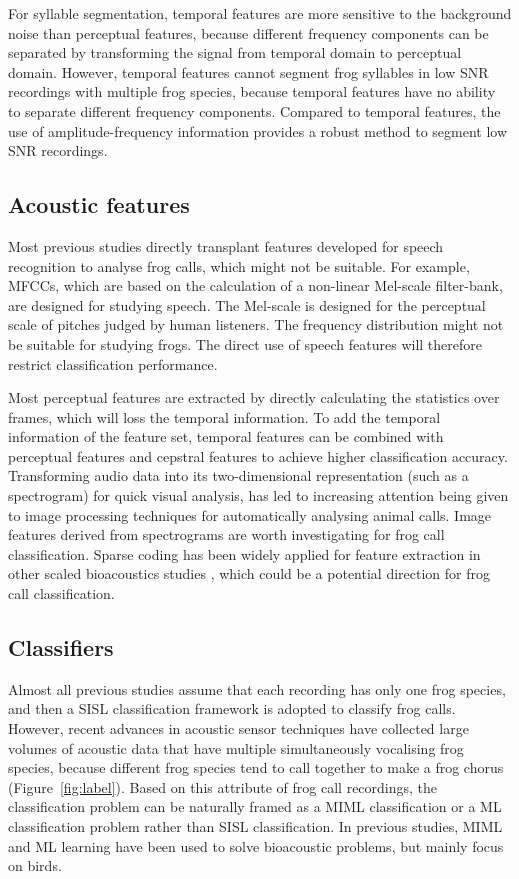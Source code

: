 For syllable segmentation, temporal features are more sensitive to  the background noise than perceptual features, because different frequency components can be separated by transforming the signal from temporal domain to perceptual domain. However, temporal features cannot segment  frog syllables in low SNR recordings with multiple frog species, because temporal features have no ability to separate different frequency components. Compared to temporal features, the use of amplitude-frequency information provides a robust method to segment low SNR recordings. 




\subsection{Acoustic features}
Most previous studies directly transplant features developed for speech recognition to analyse frog calls, which might not be suitable. For example, MFCCs, which are based on the calculation of a non-linear Mel-scale filter-bank, are designed for studying speech. The Mel-scale is designed for the perceptual scale of pitches judged by human listeners. The frequency distribution might not be suitable for studying frogs. The direct use of speech features will therefore restrict classification performance. 

Most perceptual features are extracted by directly calculating the statistics over frames, which will loss the temporal information. To add the temporal information of the feature set, temporal features can be combined with perceptual features and cepstral features to achieve higher classification accuracy. Transforming audio data into its two-dimensional representation (such as a spectrogram) for quick visual analysis, has led to increasing attention being given to image processing techniques for automatically analysing animal calls. Image features derived from spectrograms are worth investigating for frog call classification. Sparse coding has been widely applied for feature extraction in other scaled bioacoustics studies \citep{glotin2013sparse, razik2015sparse}, which could be a potential direction for frog call classification.

\subsection{Classifiers}
Almost all previous studies assume that each recording has only one frog species, and then a SISL classification framework is adopted to classify frog calls. However, recent advances in acoustic sensor techniques have collected large volumes of acoustic data that have multiple simultaneously vocalising frog species, because different frog species tend to call together to make a frog chorus (Figure~\ref{fig:label}). Based on this attribute of frog call recordings, the classification problem can be naturally framed as a MIML classification or a ML classification problem rather than SISL classification. In previous studies, MIML and ML learning have been used to solve bioacoustic problems, but mainly focus on birds. 




